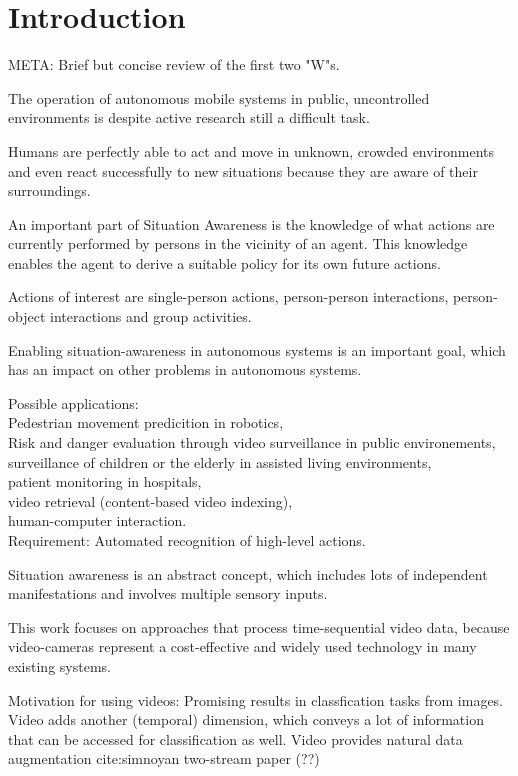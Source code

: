 \section{Introduction}
META: Brief but concise review of the first two "W"s.

The operation of autonomous mobile systems in public, uncontrolled environments is despite active research still a difficult task.

Humans are perfectly able to act and move in unknown, crowded environments and even react successfully to new situations because they are aware of their surroundings.

An important part of Situation Awareness is the knowledge of what actions are currently performed by persons in the vicinity of an agent. This knowledge enables the agent to derive a suitable policy for its own future actions.

Actions of interest are single-person actions, person-person interactions, person-object interactions and group activities.

Enabling situation-awareness in autonomous systems is an important goal, which has an impact on other problems in autonomous systems.

Possible applications:\\
Pedestrian movement predicition in robotics,\\
Risk and danger evaluation through video surveillance in public environements,\\
surveillance of children or the elderly in assisted living environments,\\
patient monitoring in hospitals,\\
video retrieval (content-based video indexing),\\
human-computer interaction.\\

Requirement: Automated recognition of high-level actions.

Situation awareness is an abstract concept, which includes lots of independent manifestations and involves multiple sensory inputs.

This work focuses on approaches that process time-sequential video data, because video-cameras represent a cost-effective and widely used technology in many existing systems.

Motivation for using videos: Promising results in classfication tasks from images. Video adds another (temporal) dimension, which conveys a lot of information that can be accessed for classification as well. Video provides natural data augmentation cite:simnoyan two-stream paper (??)

